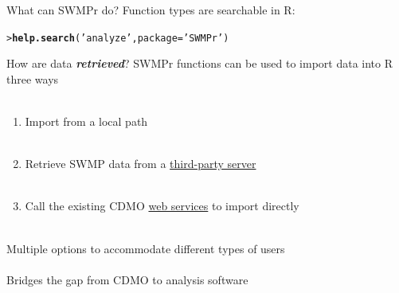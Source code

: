 \documentclass[serif]{beamer}\usepackage[]{graphicx}\usepackage[]{color}
\makeatletter
\newcommand{\hlstr}[1]{\textcolor[rgb]{0.192,0.494,0.8}{#1}}%
\newcommand{\hlstd}[1]{\textcolor[rgb]{0.345,0.345,0.345}{#1}}%
\newcommand{\hlkwc}[1]{\textcolor[rgb]{0.333,0.667,0.333}{#1}}%
\newcommand{\hlkwd}[1]{\textcolor[rgb]{0.737,0.353,0.396}{\textbf{#1}}}%
\newenvironment{kframe}{%
 \def\at@end@of@kframe{}%
 \ifinner\ifhmode%
  \def\at@end@of@kframe{\end{minipage}}%
  \begin{minipage}{\columnwidth}%
 \fi\fi%
 \def\FrameCommand##1{\hskip\@totalleftmargin \hskip-\fboxsep
 \colorbox{shadecolor}{##1}\hskip-\fboxsep
     \hskip-\linewidth \hskip-\@totalleftmargin \hskip\columnwidth}%
 \MakeFramed {\advance\hsize-\width
   \@totalleftmargin\z@ \linewidth\hsize
   \@setminipage}}%
 {\par\unskip\endMakeFramed%
 \at@end@of@kframe}
\newenvironment{knitrout}{}{} %
\newcommand{\Bigtxt}[1]{\textbf{\textit{#1}}}
\makeatother
\begin{document}
\begin{frame}[fragile]{What can SWMPr do?}
Function types are searchable in R:
\begin{knitrout}
\color{fgcolor}\begin{kframe}
\begin{alltt}
\hlstd{> }\hlkwd{help.search}\hlstd{(}\hlstr{'analyze'}\hlstd{,} \hlkwc{package} \hlstd{=} \hlstr{'SWMPr'}\hlstd{)}
\end{alltt}
\end{kframe}
\end{knitrout}
\centerline{}
\end{frame}

\begin{frame}{How are data \Bigtxt{retrieved}?}
SWMPr functions can be used to import data into R three ways\\~\\
\begin{enumerate}
\item Import from a local path \\~\\
\item Retrieve SWMP data from a \href{https://s3.amazonaws.com/swmpalldata/}{third-party server} \\~\\
\item Call the existing CDMO \href{http://cdmo.baruch.sc.edu/webservices.cfm}{web services} to import directly\\~\\
\end{enumerate}
Multiple options to accommodate different types of users \\~\\
Bridges the gap from CDMO to analysis software
\end{frame}
\end{document}
